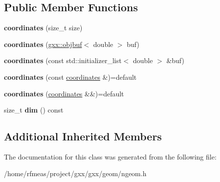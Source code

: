 \subsection*{Public Member Functions}
\begin{DoxyCompactItemize}
\item 
{\bfseries coordinates} (size\+\_\+t size)\hypertarget{classgxx_1_1ngeom_1_1coordinates_a59e2d7b6290bd5288e0b95539a41bd14}{}\label{classgxx_1_1ngeom_1_1coordinates_a59e2d7b6290bd5288e0b95539a41bd14}

\item 
{\bfseries coordinates} (\hyperlink{classgxx_1_1object__buffer}{gxx\+::objbuf}$<$ double $>$ buf)\hypertarget{classgxx_1_1ngeom_1_1coordinates_aa53f4baae93c26af40459d07ebc09600}{}\label{classgxx_1_1ngeom_1_1coordinates_aa53f4baae93c26af40459d07ebc09600}

\item 
{\bfseries coordinates} (const std\+::initializer\+\_\+list$<$ double $>$ \&buf)\hypertarget{classgxx_1_1ngeom_1_1coordinates_a6c5916f60a54f73e3315dc8f94c127b9}{}\label{classgxx_1_1ngeom_1_1coordinates_a6c5916f60a54f73e3315dc8f94c127b9}

\item 
{\bfseries coordinates} (const \hyperlink{classgxx_1_1ngeom_1_1coordinates}{coordinates} \&)=default\hypertarget{classgxx_1_1ngeom_1_1coordinates_a16c22038643673ea03773792a7fe72ff}{}\label{classgxx_1_1ngeom_1_1coordinates_a16c22038643673ea03773792a7fe72ff}

\item 
{\bfseries coordinates} (\hyperlink{classgxx_1_1ngeom_1_1coordinates}{coordinates} \&\&)=default\hypertarget{classgxx_1_1ngeom_1_1coordinates_ab8e18c964d42d35b191edf521a2a0200}{}\label{classgxx_1_1ngeom_1_1coordinates_ab8e18c964d42d35b191edf521a2a0200}

\item 
size\+\_\+t {\bfseries dim} () const \hypertarget{classgxx_1_1ngeom_1_1coordinates_af78809d856d39a9521e8f862bda570e5}{}\label{classgxx_1_1ngeom_1_1coordinates_af78809d856d39a9521e8f862bda570e5}

\end{DoxyCompactItemize}
\subsection*{Additional Inherited Members}


The documentation for this class was generated from the following file\+:\begin{DoxyCompactItemize}
\item 
/home/rfmeas/project/gxx/gxx/geom/ngeom.\+h\end{DoxyCompactItemize}
